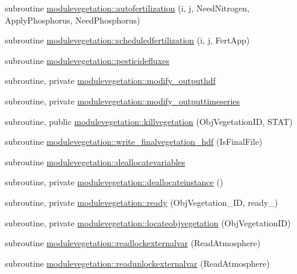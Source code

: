 \begin{DoxyCompactItemize}
\item 
subroutine \mbox{\hyperlink{namespacemodulevegetation_a75a60d7b15cdc37b7785b839927d2153}{modulevegetation\+::autofertilization}} (i, j, Need\+Nitrogen, Apply\+Phosphorus, Need\+Phosphorus)
\item 
subroutine \mbox{\hyperlink{namespacemodulevegetation_a61c84b3c83334d731a2e537c7f0373fc}{modulevegetation\+::scheduledfertilization}} (i, j, Fert\+App)
\item 
subroutine \mbox{\hyperlink{namespacemodulevegetation_af6d8868a0a498022d072c484bbfc5f73}{modulevegetation\+::pesticidefluxes}}
\item 
subroutine, private \mbox{\hyperlink{namespacemodulevegetation_ae3c35b12a954295511c0439076c44694}{modulevegetation\+::modify\+\_\+outputhdf}}
\item 
subroutine, private \mbox{\hyperlink{namespacemodulevegetation_aca579929724e1ba027a5dedcca09f4f3}{modulevegetation\+::modify\+\_\+outputtimeseries}}
\item 
subroutine, public \mbox{\hyperlink{namespacemodulevegetation_abd79c5ff82c66aadb0dd041cf80540b8}{modulevegetation\+::killvegetation}} (Obj\+Vegetation\+ID, S\+T\+AT)
\item 
subroutine \mbox{\hyperlink{namespacemodulevegetation_ad1ed23055b336a8f8253483f2289121b}{modulevegetation\+::write\+\_\+finalvegetation\+\_\+hdf}} (Is\+Final\+File)
\item 
subroutine \mbox{\hyperlink{namespacemodulevegetation_a4208f430811c220efd414cd21312b73d}{modulevegetation\+::deallocatevariables}}
\item 
subroutine, private \mbox{\hyperlink{namespacemodulevegetation_a6be2722d95215f594c5f964837e1e955}{modulevegetation\+::deallocateinstance}} ()
\item 
subroutine, private \mbox{\hyperlink{namespacemodulevegetation_a7bff2743f33908bdf727831d101dc37a}{modulevegetation\+::ready}} (Obj\+Vegetation\+\_\+\+ID, ready\+\_\+)
\item 
subroutine, private \mbox{\hyperlink{namespacemodulevegetation_ac457b656dd70c067c1609578542d0d16}{modulevegetation\+::locateobjvegetation}} (Obj\+Vegetation\+ID)
\item 
subroutine \mbox{\hyperlink{namespacemodulevegetation_a81039144c85fe53d59983283da9998a3}{modulevegetation\+::readlockexternalvar}} (Read\+Atmosphere)
\item 
subroutine \mbox{\hyperlink{namespacemodulevegetation_adc5d72657ff85d4a70bd5b3345b65563}{modulevegetation\+::readunlockexternalvar}} (Read\+Atmosphere)
\end{DoxyCompactItemize}

